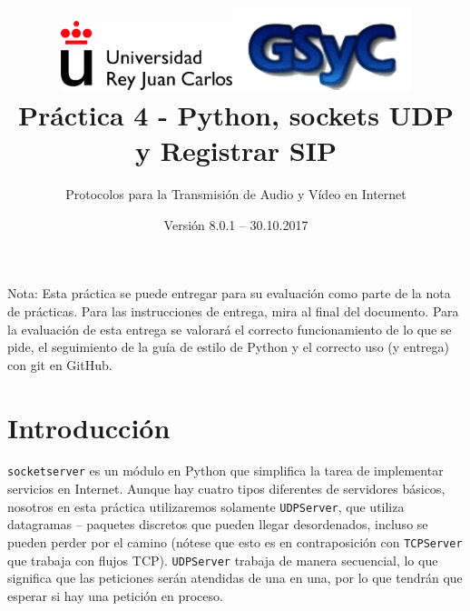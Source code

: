 \documentclass[11pt,a4paper]{article}
\begin{document}
\title{
\vspace{-3.2cm}\hspace{-1.5cm}\includegraphics[height=2cm]{img/urjc.png}\hspace{3.9cm}\includegraphics[height=2.4cm]{img/gsyc.png}\vspace{2.05cm} \\
Práctica 4 - Python, sockets UDP y Registrar SIP}
\author{Protocolos para la Transmisión de Audio y Vídeo en Internet}
\date{Versión 8.0.1 – 30.10.2017}



\maketitle




Nota: Esta práctica se puede entregar para su evaluación como parte de la nota de prácticas. Para las instrucciones de entrega, mira al final del documento. Para la evaluación de esta entrega se valorará el correcto funcionamiento de lo que se pide, el seguimiento de la guía de estilo de Python y el correcto uso (y entrega) con git en GitHub.


\section{Introducción}

\texttt{socketserver} es un módulo en Python que simplifica la tarea de implementar servicios en Internet. Aunque hay cuatro tipos diferentes de servidores básicos, nosotros en esta práctica utilizaremos solamente \texttt{UDPServer}, que utiliza datagramas -- paquetes discretos que pueden llegar desordenados, incluso se pueden perder por el camino (nótese que esto es en contraposición con \texttt{TCPServer} que trabaja con flujos TCP). \texttt{UDPServer} trabaja de manera secuencial, lo que significa que las peticiones serán atendidas de una en una, por lo que tendrán que esperar si hay una petición en proceso.
\end{document}
